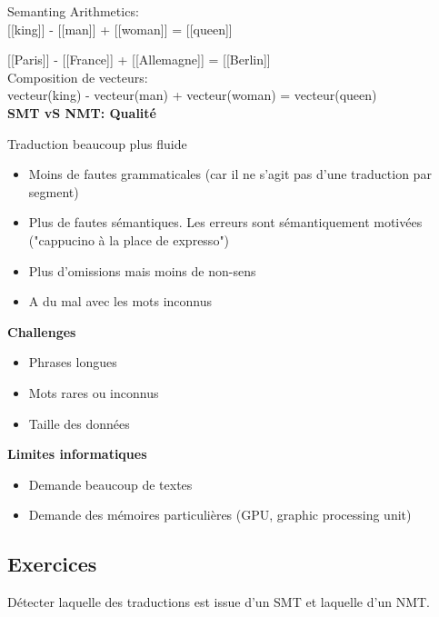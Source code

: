 Semanting Arithmetics: \\

[[king]] - [[man]] + [[woman]] = [[queen]]

[[Paris]] - [[France]] + [[Allemagne]] = [[Berlin]]\\

Composition de vecteurs: \\

vecteur(king) - vecteur(man) + vecteur(woman) = vecteur(queen)\\

\textbf{SMT vS NMT: Qualité}

Traduction beaucoup plus fluide

\begin{itemize}
    \item Moins de fautes grammaticales (car il ne s'agit pas d'une traduction par segment)
    \item Plus de fautes sémantiques. Les erreurs sont sémantiquement motivées ("cappucino à la place de expresso")
    \item Plus d'omissions mais moins de non-sens
    \item A du mal avec les mots inconnus\\
\end{itemize}

\textbf{Challenges}

\begin{itemize}
    \item Phrases longues
    \item Mots rares ou inconnus
    \item Taille des données\\
\end{itemize}

\textbf{Limites informatiques}

\begin{itemize}
    \item Demande beaucoup de textes
    \item Demande des mémoires particulières (GPU, graphic processing unit)\\
\end{itemize}

\subsection{Exercices}

Détecter laquelle des traductions est issue d'un SMT et laquelle d'un NMT.\\

